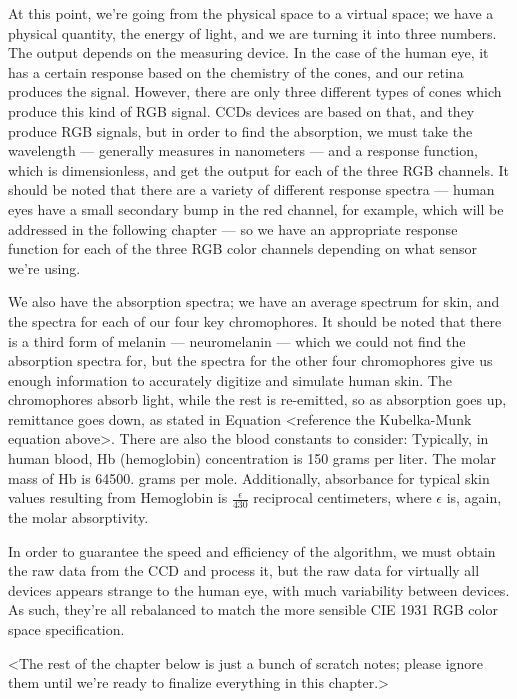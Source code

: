 At this point, we're going from the physical space to a virtual space; we have a physical quantity, the energy of light, and we are turning it into three numbers. The output depends on the measuring device. In the case of the human eye, it has a certain response based on the chemistry of the cones, and our retina produces the signal. However, there are only three different types of cones which produce this kind of RGB signal. CCDs devices are based on that, and they produce RGB signals, but in order to find the absorption, we must take the wavelength --- generally measures in nanometers --- and a response function, which is dimensionless, and get the output for each of the three RGB channels. It should be noted that there are a variety of different response spectra --- human eyes have a small secondary bump in the red channel, for example, which will be addressed in the following chapter --- so we have an appropriate response function for each of the three RGB color channels depending on what sensor we're using.

We also have the absorption spectra; we have an average spectrum for skin, and the spectra for each of our four key chromophores. It should be noted that there is a third form of melanin --- neuromelanin --- which we could not find the absorption spectra for, but the spectra for the other four chromophores give us enough information to accurately digitize and simulate human skin. The chromophores absorb light, while the rest is re-emitted, so as absorption goes up, remittance goes down, as stated in Equation <reference the Kubelka-Munk equation above>. There are also the blood constants to consider: Typically, in human blood, Hb (hemoglobin) concentration is 150 grams per liter. The molar mass of Hb is 64500. grams per mole. Additionally, absorbance for typical skin values resulting from Hemoglobin is $\frac{\epsilon}{430}$ reciprocal centimeters, where $\epsilon$ is, again, the molar absorptivity.

In order to guarantee the speed and efficiency of the algorithm, we must obtain the raw data from the CCD and process it, but the raw data for virtually all devices appears strange to the human eye, with much variability between devices. As such, they're all rebalanced to match the more sensible CIE 1931 RGB color space specification.


<The rest of the chapter below is just a bunch of scratch notes; please ignore them until we're ready to finalize everything in this chapter.>




